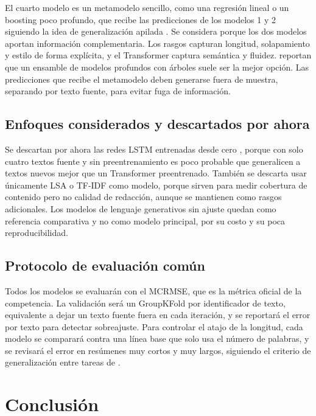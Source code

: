 \documentclass[11pt,a4paper]{article}
\begin{document}
El cuarto modelo es un metamodelo sencillo, como una regresión lineal o un boosting poco profundo, que recibe las predicciones de los modelos 1 y 2 siguiendo la idea de generalización apilada \citep{wolpert1992}. Se considera porque los dos modelos aportan información complementaria. Los rasgos capturan longitud, solapamiento y estilo de forma explícita, y el Transformer captura semántica y fluidez. \citet{shwartz2022} reportan que un ensamble de modelos profundos con árboles suele ser la mejor opción. Las predicciones que recibe el metamodelo deben generarse fuera de muestra, separando por texto fuente, para evitar fuga de información.

\subsection{Enfoques considerados y descartados por ahora}

Se descartan por ahora las redes LSTM entrenadas desde cero \citep{taghipour2016}, porque con solo cuatro textos fuente y sin preentrenamiento es poco probable que generalicen a textos nuevos mejor que un Transformer preentrenado. También se descarta usar únicamente LSA o TF-IDF \citep{landauer1998,salton1988} como modelo, porque sirven para medir cobertura de contenido pero no calidad de redacción, aunque se mantienen como rasgos adicionales. Los modelos de lenguaje generativos sin ajuste \citep{mizumoto2023} quedan como referencia comparativa y no como modelo principal, por su costo y su poca reproducibilidad.

\subsection{Protocolo de evaluación común}

Todos los modelos se evaluarán con el MCRMSE, que es la métrica oficial de la competencia. La validación será un GroupKFold por identificador de texto, equivalente a dejar un texto fuente fuera en cada iteración, y se reportará el error por texto para detectar sobreajuste. Para controlar el atajo de la longitud, cada modelo se comparará contra una línea base que solo usa el número de palabras, y se revisará el error en resúmenes muy cortos y muy largos, siguiendo el criterio de generalización entre tareas de \citet{williamson2012}.

\section{Conclusión}
\end{document}

